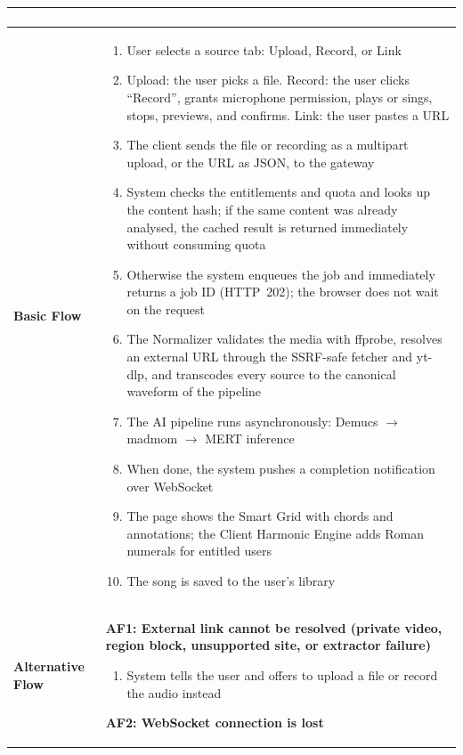 \documentclass[a4paper]{article}
\newlength{\ucLeft}
\begin{document}
\begin{longtable}{|>{\bfseries}p{\ucLeft}|p{\dimexpr\linewidth-\ucLeft-2\tabcolsep-2\arrayrulewidth}|}
\begin{itemize}[leftmargin=1em, nosep, topsep=2pt, partopsep=0pt, parsep=0pt, after=\strut]
\end{itemize}
\\ \hline
Basic Flow &
\begin{enumerate}[leftmargin=1.5em, nosep, topsep=2pt, partopsep=0pt, parsep=0pt, after=\strut]
    \item User selects a source tab: Upload, Record, or Link
    \item Upload: the user picks a file. Record: the user clicks ``Record'', grants microphone permission, plays or sings, stops, previews, and confirms. Link: the user pastes a URL
    \item The client sends the file or recording as a multipart upload, or the URL as JSON, to the gateway
    \item System checks the entitlements and quota and looks up the content hash; if the same content was already analysed, the cached result is returned immediately without consuming quota
    \item Otherwise the system enqueues the job and immediately returns a job ID (HTTP~202); the browser does not wait on the request
    \item The Normalizer validates the media with ffprobe, resolves an external URL through the SSRF-safe fetcher and yt-dlp, and transcodes every source to the canonical waveform of the pipeline
    \item The AI pipeline runs asynchronously: Demucs $\rightarrow$ madmom $\rightarrow$ MERT inference
    \item When done, the system pushes a completion notification over WebSocket
    \item The page shows the Smart Grid with chords and annotations; the Client Harmonic Engine adds Roman numerals for entitled users
    \item The song is saved to the user's library
\end{enumerate}
\\ \hline
Alternative Flow &
\textbf{AF1: External link cannot be resolved (private video, region block, unsupported site, or extractor failure)}
\begin{enumerate}[leftmargin=1.5em, nosep, topsep=2pt, partopsep=0pt, parsep=0pt, after=\strut]
    \item System tells the user and offers to upload a file or record the audio instead
\end{enumerate}
\textbf{AF2: WebSocket connection is lost}
\begin{enumerate}[leftmargin=1.5em, nosep, topsep=2pt, partopsep=0pt, parsep=0pt, after=\strut]

\end{enumerate}
\end{longtable}
\end{document}
